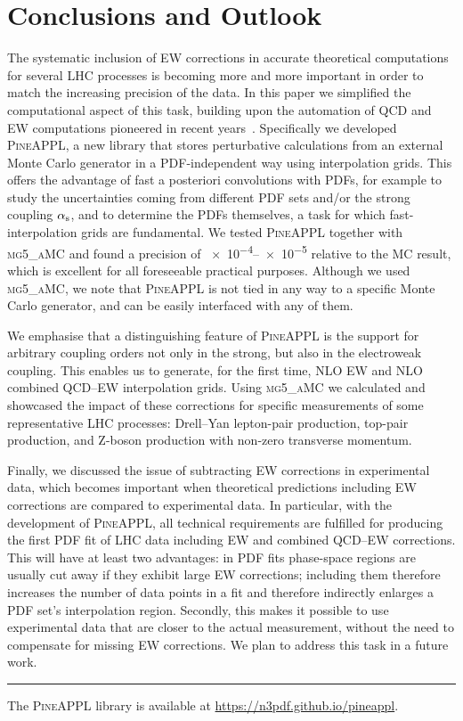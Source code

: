 \section{Conclusions and Outlook}
\label{sec:conclusion}

The systematic inclusion of EW corrections in accurate theoretical computations
for several LHC processes is becoming more and more important in order to
match the increasing precision of the data. In this paper we simplified the
computational aspect of this task, building upon the automation of QCD and EW
computations pioneered in recent years~\cite{Kallweit:2014xda,Biedermann:2017yoi,Frederix:2018nkq}.
Specifically we developed \textsc{PineAPPL}, a new library that stores perturbative calculations from an external Monte Carlo generator in a PDF-independent way using interpolation grids.
This offers the advantage of fast a posteriori convolutions with PDFs, for example to study the uncertainties coming from different PDF sets and/or the strong coupling $\alpha_\mathrm{s}$, and to determine the PDFs themselves, a task for
which fast-interpolation grids are fundamental.
We tested \textsc{PineAPPL} together with \textsc{mg5\_aMC} and found a precision of \numrange{e-4}{e-5} relative to the MC result, which is excellent for all
foreseeable practical purposes.
Although we used \textsc{mg5\_aMC}, we note that \textsc{PineAPPL} is not tied in any way to a specific Monte Carlo generator, and can be easily interfaced with any of them.

We emphasise that a distinguishing feature of \textsc{PineAPPL} is the support for arbitrary coupling orders not only in the strong, but also in the electroweak coupling.
This enables us to generate, for the first time, NLO EW and NLO combined QCD--EW interpolation grids.
Using \textsc{mg5\_aMC} we calculated and showcased the impact of these corrections for specific measurements of some representative LHC processes: Drell--Yan lepton-pair production, top-pair production, and Z-boson production with non-zero transverse momentum. 

Finally, we discussed the issue of subtracting EW corrections in experimental data, which becomes important when theoretical predictions including EW corrections are compared to experimental data. In particular, with the
development of \textsc{PineAPPL}, all technical requirements are fulfilled for producing the first PDF fit of LHC data including EW and combined QCD--EW corrections.
This will have at least two advantages: in PDF fits phase-space regions are usually cut away if they exhibit large EW corrections; including them therefore increases the number of data points in a fit and therefore indirectly enlarges a PDF set's interpolation region.
Secondly, this makes it possible to use experimental data that are closer to the actual measurement, without the need to compensate for missing EW corrections.
We plan to address this task in a future work.

\vspace{0.5cm}
\hrule
\begin{center}
The \textsc{PineAPPL} library is available at \url{https://n3pdf.github.io/pineappl}.
\end{center}
